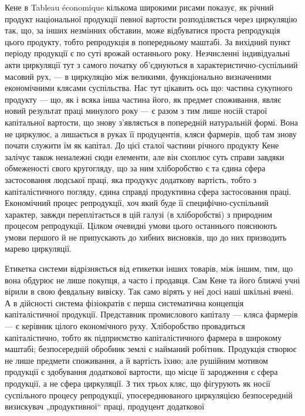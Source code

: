 


\label{original-274}
Кене
в Tableau économique кількома широкими рисами показує, як
річний продукт національної продукції певної вартости розподіляється через
циркуляцію так, що, за інших незмінних обставин, може відбуватися проста
репродукція цього продукту, тобто репродукція в попередньому маштабі.
За вихідний пункт періоду продукції є по суті врожай останнього року.
Незчисленні індивідуальні акти циркуляції тут з самого початку об’єднуються
в характеристично-суспільний масовий рух, — в циркуляцію між
великими, функціонально визначеними економічними клясами суспільства.
Нас тут цікавить ось що: частина сукупного продукту — що, як і всяка
інша частина його, як предмет споживання, являє новий результат праці
минулого року — є разом з тим лише носій старої капітальної вартости,
що знову з’являється в попередній натуральній формі. Вона не циркулює,
а лишається в руках її продуцентів, кляси фармерів, щоб там знову почати
служити їм як капітал. До цієї сталої частини річного продукту
Кене залічує також неналежні сюди елементи, але він схоплює суть
справи завдяки обмеженості свого кругогляду, що за ним хліборобство є
та єдина сфера застосовання людської праці, яка продукує додаткову
вартість, тобто з капіталістичного погляду, єдина справді продуктивна
сфера застосовання праці. Економічний процес репродукції, хоч який
буде її специфічно-суспільний характер, завжди переплітається в цій
галузі (в хліборобстві) з природним процесом репродукції. Цілком очевидні
умови цього останнього пояснюють умови першого й не припускають
до хибних висновків, що до них призводить марево циркуляції.

Етикетка системи відрізняється від етикетки інших товарів, між
іншим, тим, що вона обдурює не лише покупця, а часто і продавця.
Сам Кене та його ближчі учні вірили в свою февдальну вивіску. Так
само вірять у неї досі наші шкільні вчені. А в дійсності система фізіократів
є перша систематична концепція капіталістичної продукції. Представник
промислового капіталу — кляса фармерів — є керівник цілого
економічного руху. Хліборобство провадиться капіталістично, тобто як
підприємство капіталістичного фармера в широкому маштабі; безпосередній
обробник землі є найманий робітник. Продукція створює не лише
предмети споживання, а й вартість їхню; але рушійним мотивом продукції
є здобування додаткової вартости, що місце її зародження є
сфера продукції, а не сфера циркуляції. З тих трьох кляс, що фігурують
як носії суспільного процесу репродукції, упосереднюваного циркуляцією
безпосередній визискувач „продуктивної“ праці, продуцент додаткової
\parbreak{}  %
